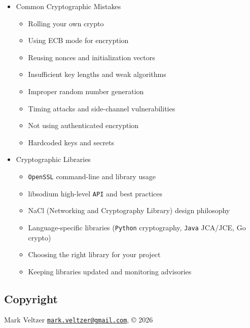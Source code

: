 \documentclass[
]{article}
\providecommand{\tightlist}{%
  \setlength{\itemsep}{0pt}\setlength{\parskip}{0pt}}
\begin{document}
\begin{itemize}
  \begin{itemize}
  \tightlist
  \item
    Quantum computing threat to current cryptography
  \item
    \texttt{NIST} post-quantum standardization process
  \item
    Lattice-based cryptography (CRYSTALS-Kyber, CRYSTALS-Dilithium)
  \item
    Hash-based signatures (SPHINCS+)
  \item
    Migration planning and crypto agility
  \item
    Hybrid classical/post-quantum approaches
  \end{itemize}
\item
  Common Cryptographic Mistakes

  \begin{itemize}
  \tightlist
  \item
    Rolling your own crypto
  \item
    Using ECB mode for encryption
  \item
    Reusing nonces and initialization vectors
  \item
    Insufficient key lengths and weak algorithms
  \item
    Improper random number generation
  \item
    Timing attacks and side-channel vulnerabilities
  \item
    Not using authenticated encryption
  \item
    Hardcoded keys and secrets
  \end{itemize}
\item
  Cryptographic Libraries

  \begin{itemize}
  \tightlist
  \item
    \texttt{OpenSSL} command-line and library usage
  \item
    libsodium high-level \texttt{API} and best practices
  \item
    NaCl (Networking and Cryptography Library) design philosophy
  \item
    Language-specific libraries (\texttt{Python} cryptography,
    \texttt{Java} JCA/JCE, Go crypto)
  \item
    Choosing the right library for your project
  \item
    Keeping libraries updated and monitoring advisories
  \end{itemize}
\end{itemize}

\subsection{Copyright}\label{copyright}

Mark Veltzer
\href{mailto:mark.veltzer@gmail.com}{\nolinkurl{mark.veltzer@gmail.com}},
© 2026
\end{document}
